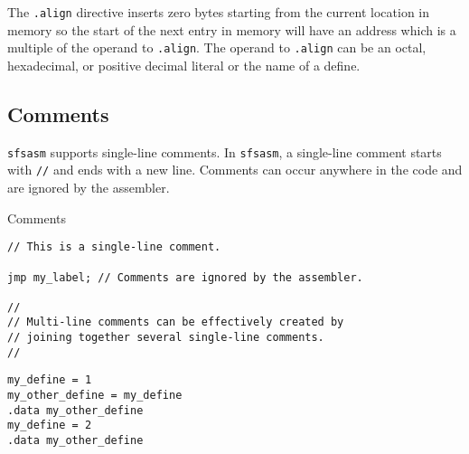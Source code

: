 The {\tt .align} directive inserts zero bytes starting from the current location in memory so the start of the next entry in memory will have an address which is a multiple of the operand to {\tt .align}. The operand to {\tt .align} can be an octal, hexadecimal, or positive decimal literal or the name of a define.

\subsection{Comments}
{\tt sfsasm} supports single-line comments. In {\tt sfsasm}, a single-line comment starts with {\tt //} and ends with a new line. Comments can occur anywhere in the code and are ignored by the assembler.

\begin{codebox}{Comments}
\begin{verbatim}
// This is a single-line comment.

jmp my_label; // Comments are ignored by the assembler.

//
// Multi-line comments can be effectively created by
// joining together several single-line comments.
//
\end{verbatim}
\end{codebox}

\begin{verbatim}
my_define = 1
my_other_define = my_define
.data my_other_define
my_define = 2
.data my_other_define
\end{verbatim}

